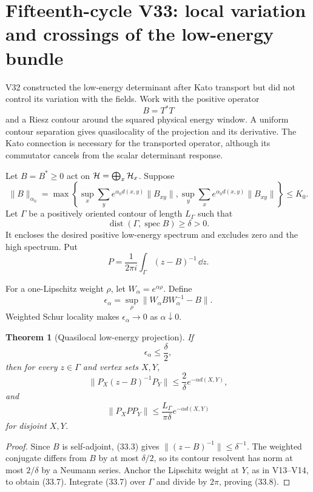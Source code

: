 \documentclass[11pt]{article}
\newtheorem{theorem}{Theorem}[section]
\theoremstyle{remark}
\begin{document}
\section{Fifteenth-cycle V33: local variation and crossings of the low-energy bundle}
\label{sec:v15v33}

V32 constructed the low-energy determinant after Kato transport but
did not control its variation with the fields.  Work with the
positive operator
\[
 B=T^*T                                                     \tag{33.1}
\]
and a Riesz contour around the squared physical energy window.
A uniform contour separation gives quasilocality of the projection
and its derivative.  The Kato connection is necessary for the
transported operator, although its commutator cancels from the
scalar determinant response.

Let \(B=B^*\ge0\) act on
\({\cal H}=\bigoplus_x{\cal H}_x\).  Suppose
\[
 \|B\|_{\alpha_0}
 =
 \max\left\{
 \sup_x\sum_y e^{\alpha_0d(x,y)}\|B_{xy}\|,
 \sup_y\sum_x e^{\alpha_0d(x,y)}\|B_{xy}\|
 \right\}
 \le K_0.                                                   \tag{33.2}
\]
Let \(\Gamma\) be a positively oriented contour of length
\(L_\Gamma\) such that
\[
 \operatorname{dist}(\Gamma,\operatorname{spec}B)\ge\delta>0.
                                                               \tag{33.3}
\]
It encloses the desired positive low-energy spectrum and excludes
zero and the high spectrum.  Put
\[
 P=\frac{1}{2\pi i}\int_\Gamma(z-B)^{-1}\,\dd z.            \tag{33.4}
\]

For a one-Lipschitz weight \(\rho\), let
\(W_\alpha=e^{\alpha\rho}\).  Define
\[
 \epsilon_\alpha
 =
 \sup_\rho\|W_\alpha BW_\alpha^{-1}-B\|.                   \tag{33.5}
\]
Weighted Schur locality makes \(\epsilon_\alpha\to0\) as
\(\alpha\downarrow0\).

\begin{theorem}[Quasilocal low-energy projection]
\label{thm:v15v33-projection}
If
\[
 \epsilon_\alpha\le\frac\delta2,                            \tag{33.6}
\]
then for every \(z\in\Gamma\) and vertex sets \(X,Y\),
\[
 \|P_X(z-B)^{-1}P_Y\|
 \le\frac2\delta e^{-\alpha d(X,Y)},                       \tag{33.7}
\]
and
\[
 \boxed{
 \|P_XPP_Y\|
 \le\frac{L_\Gamma}{\pi\delta}
 e^{-\alpha d(X,Y)}}                                      \tag{33.8}
\]
for disjoint \(X,Y\).
\end{theorem}

\begin{proof}
Since \(B\) is self-adjoint, (33.3) gives
\(\|(z-B)^{-1}\|\le\delta^{-1}\).  The weighted conjugate differs
from \(B\) by at most \(\delta/2\), so its contour resolvent has norm
at most \(2/\delta\) by a Neumann series.  Anchor the Lipschitz
weight at \(Y\), as in V13--V14, to obtain (33.7).  Integrate
(33.7) over \(\Gamma\) and divide by \(2\pi\), proving (33.8).
\end{proof}
\end{document}
